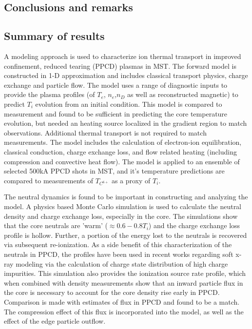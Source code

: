 \begin{refsection}


\chapter{Conclusions and remarks}

\section{Summary of results}

A modeling approach is used to characterize ion thermal transport in improved confinement, reduced tearing (PPCD) plasmas in MST. The forward model is constructed in 1-D approximation and includes classical transport physics, charge exchange and particle flow. The model uses a range of diagnostic inputs to provide the plasma profiles (of $T_e$, $n_e$,$n_D$ as well as reconstructed magnetic) to predict $T_i$ evolution from an initial condition. This model is compared to measurement and found to be sufficient in predicting the core temperature evolution, but needed an \adhoc heating source localized in the gradient region to match observations. Additional thermal transport is not required to match measurements. The model includes the calculation of electron-ion equilibration, classical conduction, charge exchange loss, and flow related heating (including compression and convective heat flow). The model is applied to an ensemble of selected 500kA PPCD shots in MST, and it's temperature predictions are compared to measurements of $T_{C^{6+}}$ as a proxy of $T_i$.

The neutral dynamics is found to be important in constructing and analyzing the model. A physics based Monte Carlo simulation is used to calculate the neutral density and charge exchange loss, especially in the core. The simulations show that the core neutrals are 'warm' ($\approx 0.6-0.8 T_i$) and the charge exchange loss profile is hollow. Further, a portion of the energy lost to the neutrals is recovered via subsequent re-ionization. As a side benefit of this characterization of the neutrals in PPCD, the profiles have been used in recent works regarding soft x-ray modeling via the calculation of charge state distribution of high charge impurities. This simulation also provides the ionization source rate profile, which when combined with density measurements show that an inward particle flux in the core is necessary to account for the core density rise early in PPCD. Comparison is made with estimates of \ecb flux in PPCD and found to be a match. The compression effect of this flux is incorporated into the model, as well as the effect of the edge particle outflow. 


\end{refsection}
